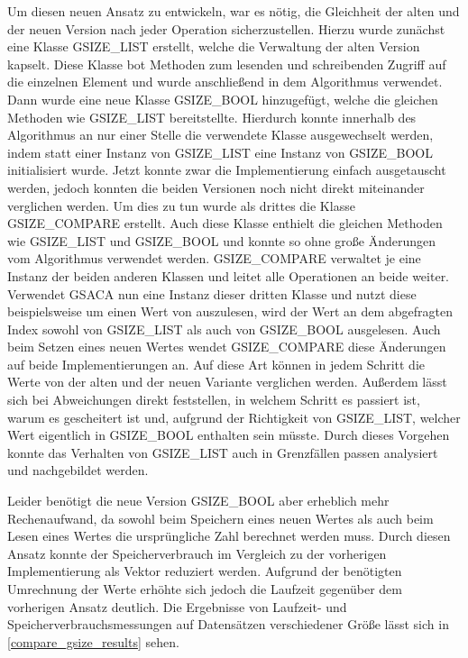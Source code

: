Um diesen neuen Ansatz zu entwickeln, war es nötig, die Gleichheit der alten und der neuen Version nach jeder Operation sicherzustellen.
Hierzu wurde zunächst eine Klasse GSIZE\_LIST erstellt, welche die Verwaltung der alten Version kapselt.
Diese Klasse bot Methoden zum lesenden und schreibenden Zugriff auf die einzelnen Element und wurde anschließend in dem Algorithmus verwendet.
Dann wurde eine neue Klasse GSIZE\_BOOL hinzugefügt, welche die glei\-chen Methoden wie GSIZE\_LIST bereitstellte.
Hierdurch konnte innerhalb des Algorithmus an nur einer Stelle die verwendete Klasse ausgewechselt werden, indem statt einer Instanz von GSIZE\_LIST eine Instanz von GSIZE\_BOOL initialisiert wurde.
Jetzt konnte zwar die Implementierung einfach ausgetauscht werden, jedoch konnten die beiden Versionen noch nicht direkt miteinander verglichen werden.
Um dies zu tun wurde als drittes die Klasse GSIZE\_COMPARE erstellt.
Auch diese Klasse enthielt die gleichen Methoden wie GSIZE\_LIST und GSIZE\_BOOL und konnte so ohne große Änderungen vom Algorithmus verwendet werden.
GSIZE\_COMPARE verwaltet je eine Instanz der beiden anderen Klassen und leitet alle Operationen an beide weiter.
Verwendet GSACA nun eine Instanz dieser dritten Klasse und nutzt diese beispielsweise um einen Wert von \gsize auszulesen, wird der Wert an dem abgefragten Index sowohl von GSIZE\_LIST als auch von GSIZE\_BOOL ausgelesen.
Auch beim Setzen eines neuen Wertes wendet GSIZE\_COMPARE diese Änderungen auf beide Implementierungen an.
Auf diese Art können in jedem Schritt die Werte von der alten und der neuen Variante verglichen werden.
Außerdem lässt sich bei Abweichungen direkt feststellen, in welchem Schritt es passiert ist, warum es gescheitert ist und, aufgrund der Richtigkeit von GSIZE\_LIST, welcher Wert eigentlich in GSIZE\_BOOL enthalten sein müsste.
Durch dieses Vorgehen konnte das Verhalten von GSIZE\_LIST auch in Grenzfällen passen analysiert und nachgebildet werden. \par
Leider benötigt die neue Version GSIZE\_BOOL aber erheblich mehr Re\-chen\-auf\-wand, da sowohl beim Speichern eines neuen Wertes als auch beim Lesen eines Wertes die ursprüngliche Zahl berechnet werden muss.
Durch diesen Ansatz konnte der Speicherverbrauch im Vergleich zu der vorherigen Implementierung als Vektor reduziert werden.
Aufgrund der benötigten Umrechnung der Werte erhöhte sich jedoch die Laufzeit gegenüber dem vorherigen Ansatz deutlich.
Die Ergebnisse von Laufzeit- und Speicherverbrauchsmessungen auf Datensätzen verschiedener Größe lässt sich in \ref{compare_gsize_results} sehen.
